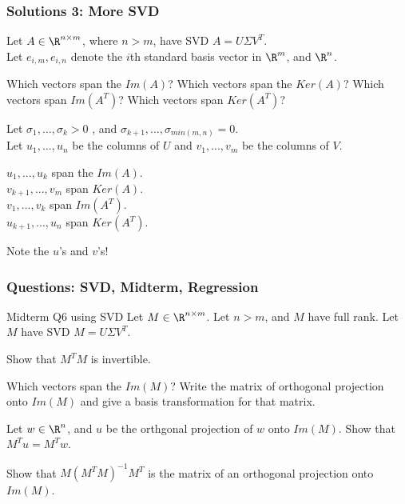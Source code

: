 \documentclass{beamer}
\renewenvironment{enumerate}%
{\begin{list}{\arabic{enumi}.}%
      {\setlength{\leftmargin}{2.5em}%
       \setlength{\itemsep}{-\parsep}%
       \setlength{\topsep}{-\parskip}%
       \usecounter{enumi}}%
 }{\end{list}}
\begin{document}
\begin{frame}
\frametitle{Solutions 3: More SVD}
Let $A\in \R^{n\times m}$, where $n>m$, have SVD $A=U\Sigma V^T$.\\ 
Let $e_{i,m}, e_{i,n}$ denote the $i$th standard basis vector in $\R^m$, and $\R^n$.
\begin{enumerate}
\item[3.] Which vectors span the $Im(A)$? Which vectors span the $Ker(A)$? Which vectors span $Im(A^T)$? Which vectors span $Ker(A^T)$?
\begin{solution}
Let $\sigma_1,...,\sigma_k > 0$ , and $\sigma_{k+1},...,\sigma_{min(m,n)} = 0$.\\
Let $u_1,...,u_n$ be the columns of $U$ and $v_1,...,v_m$ be the columns of $V$.\\
\medskip

$u_1,...,u_k$ span the $Im(A)$.\\
$v_{k+1},..., v_m$ span $Ker(A)$. \\
\medskip
$v_1,...,v_k$ span $Im(A^T)$. \\
$u_{k+1},...,u_n$ span $Ker(A^T)$.\\
\end{solution}
Note the $u$'s and $v$'s!
\end{enumerate}
\end{frame}

\begin{frame}
\frametitle{Questions: SVD, Midterm, Regression}
Midterm Q6 using SVD
Let $M\in \R^{n\times m}$. Let $n>m$, and $M$ have full rank. Let $M$ have SVD $M= U\Sigma V^T$.
\begin{enumerate}

\item Show that $M^TM$ is invertible.
\item Which vectors span the $Im(M)$? Write the matrix of orthogonal projection onto $Im(M)$ and give a basis transformation for that matrix.
\item Let $w\in \R^n$, and $u$ be the orthgonal projection of $w$ onto $Im(M)$. Show that $M^Tu = M^Tw$.
\item Show that $M(M^TM)^{-1}M^T$ is the matrix of an orthogonal projection onto $Im(M)$.
\end{enumerate}
\end{frame}
\end{document}
